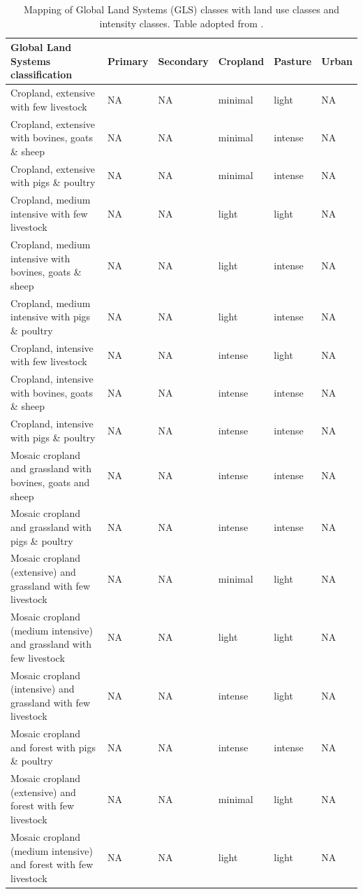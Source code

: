 \documentclass[titlesmallcaps,copyrightpage]{uomthesis}\usepackage[]{graphicx}\usepackage[]{color}
\begin{document}
\begin{table}[htb]
\centering
\caption{Mapping of Global Land Systems (GLS) classes with land use classes and intensity classes. Table adopted from \citet{newbold_global_2015}.}
\label{apx:ch4:tab_glsmapping}
\begin{tabularx}{1\textwidth}{Ylllll}
\toprule
Global Land Systems classification & Primary & Secondary & Cropland & Pasture & Urban \\
\bottomrule
Cropland, extensive with few livestock & NA & NA & minimal & light & NA \\
Cropland, extensive with bovines, goats \& sheep & NA & NA & minimal & intense & NA \\
Cropland, extensive with pigs \& poultry & NA & NA & minimal & intense & NA \\
Cropland, medium intensive with few livestock & NA & NA & light & light & NA \\
Cropland, medium intensive with bovines, goats \& sheep & NA & NA & light & intense & NA \\
Cropland, medium intensive with pigs \& poultry & NA & NA & light & intense & NA \\
Cropland, intensive with few livestock & NA & NA & intense & light & NA \\
Cropland, intensive with bovines, goats \& sheep & NA & NA & intense & intense & NA \\
Cropland, intensive with pigs \& poultry & NA & NA & intense & intense & NA \\
Mosaic cropland and grassland with bovines, goats and sheep & NA & NA & intense & intense & NA \\
Mosaic cropland and grassland with pigs \& poultry & NA & NA & intense & intense & NA \\
Mosaic cropland (extensive) and grassland with few livestock & NA & NA & minimal & light & NA \\
Mosaic cropland (medium intensive) and grassland with few livestock & NA & NA & light & light & NA \\
Mosaic cropland (intensive) and grassland with few livestock & NA & NA & intense & light & NA \\
Mosaic cropland and forest with pigs \& poultry & NA & NA & intense & intense & NA \\
Mosaic cropland (extensive) and forest with few livestock & NA & NA & minimal & light & NA \\
Mosaic cropland (medium intensive) and forest with few livestock & NA & NA & light & light & NA \\

\end{tabularx}
\end{table}
\end{document}

